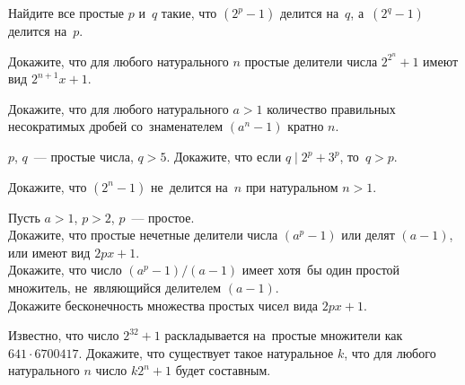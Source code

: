 \begin{problems}

\item
Найдите все простые $p$ и~$q$ такие, что $(2^p - 1)$ делится на~$q$,
а~$(2^q - 1)$ делится на~$p$.

\item
Докажите, что для любого натурального $n$ простые делители числа $2^{2^n} + 1$
имеют вид $2^{n+1} x + 1$.

\item
Докажите, что для любого натурального $a > 1$ количество правильных
несократимых дробей со~знаменателем $(a^n - 1)$ кратно $n$.

\item
$p$, $q$~--- простые числа, $q > 5$.
Докажите, что если $q \mid 2^p + 3^p$, то~$q > p$.

\item
Докажите, что $(2^n - 1)$ не~делится на~$n$ при натуральном $n > 1$.

\item
Пусть $a > 1$, $p > 2$, $p$~--- простое.
\\
\sp
Докажите, что простые нечетные делители числа $(a^p - 1)$ или делят $(a - 1)$,
или имеют вид $2 p x + 1$.
\\
\sp
Докажите, что число $(a^p - 1) / (a - 1)$ имеет хотя~бы один простой
множитель, не~являющийся делителем $(a - 1)$.
\\
\sp
Докажите бесконечность множества простых чисел вида $2 p x + 1$.

\item
Известно, что число $2^{32} + 1$ раскладывается на~простые множители как
$641 \cdot 6700417$.
Докажите, что существует такое натуральное $k$, что для любого
натурального $n$ число $k 2^n + 1$ будет составным.

\end{problems}

